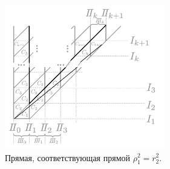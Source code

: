 \begin{figure}[!htb]
\centering
\includegraphics[width=7cm]{images/section3_circular/B1Prime_lattice.pdf}
    \caption{Прямая, соответствующая прямой $\rho_1^2 = r_2^2$.}
    \label{fig:pt10:_B1Prime_lattice}
\end{figure}


